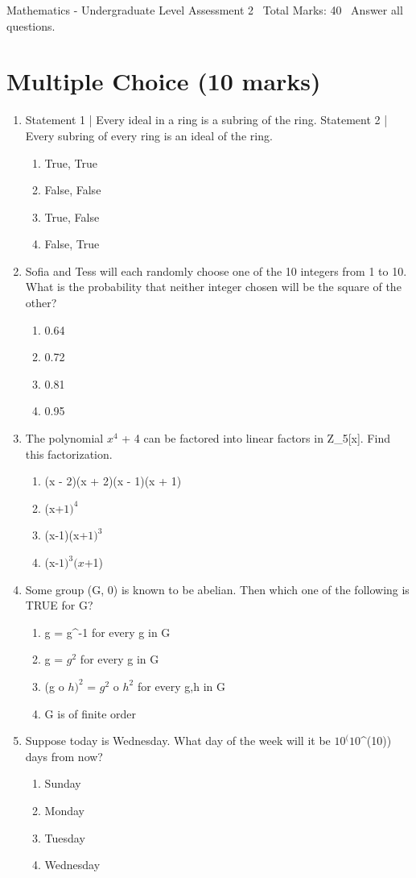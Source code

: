 \documentclass[12pt]{article}
\begin{document}
\begin{center}
Mathematics - Undergraduate Level Assessment 2 \
Total Marks: 40 \
Answer all questions.
\end{center}

\section*{Multiple Choice (10 marks)}
\begin{enumerate}[label=\arabic*.]
\item Statement 1 | Every ideal in a ring is a subring of the ring. Statement 2 | Every subring of every ring is an ideal of the ring.
\begin{enumerate}[label=(\alph*)]
    \item True, True
    \item False, False
    \item True, False
    \item False, True
\end{enumerate}
\item Sofia and Tess will each randomly choose one of the 10 integers from 1 to 10. What is the probability that neither integer chosen will be the square of the other?
\begin{enumerate}[label=(\alph*)]
    \item 0.64
    \item 0.72
    \item 0.81
    \item 0.95
\end{enumerate}
\item The polynomial $x^4$ + 4 can be factored into linear factors in Z\_5[x]. Find this factorization.
\begin{enumerate}[label=(\alph*)]
    \item (x - 2)(x + 2)(x - 1)(x + 1)
    \item (x+$1)^4$
    \item (x-1)(x+$1)^3$
    \item (x-$1)^3(x$+1)
\end{enumerate}
\item Some group (G, 0) is known to be abelian. Then which one of the following is TRUE for G?
\begin{enumerate}[label=(\alph*)]
    \item g = g^-1 for every g in G
    \item g = $g^2$ for every g in G
    \item (g o $h)^2$ = $g^2$ o $h^2$ for every g,h in G
    \item G is of finite order
\end{enumerate}
\item Suppose today is Wednesday. What day of the week will it be $10^(10$^(10)) days from now?
\begin{enumerate}[label=(\alph*)]
    \item Sunday
    \item Monday
    \item Tuesday
    \item Wednesday
\end{enumerate}
\end{enumerate}
\end{document}
